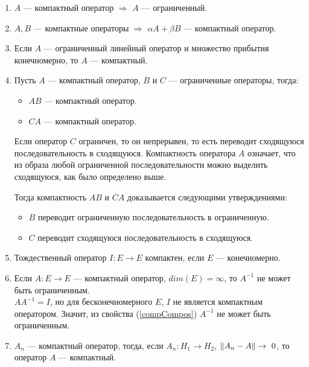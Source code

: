 \documentclass[12pt]{article}
\begin{document}
			\begin{enumerate}
				\item $A$ --- компактный оператор $\Rightarrow$ $A$ --- ограниченный.		
				\item $A, B$ --- компактные операторы $\Rightarrow$ $\alpha A + \beta B$ --- компактный оператор.		
				\item Если $A$ --- ограниченный линейный оператор и множество прибытия конечномерно, то $A$ --- компактный. \label{compArea}
				\item Пусть $A$ --- компактный оператор, $B$ и $C$ --- ограниченные операторы, тогда: \label{compCompos}
					\begin{itemize}
						\item $AB$ --- компактный оператор.
						\item $CA$ --- компактный оператор.
					\end{itemize}
		
					Если оператор $C$ ограничен, то он непрерывен, то есть переводит сходящуюся последовательность 
					в сходящуюся. Компактность оператора $A$ означает, что из образа любой ограниченной 
					последовательности можно выделить сходящуюся, как было определено выше.
		
					Тогда компактность $AB$ и $CA$ доказывается следующими утверждениями:
					\begin{itemize}
						\item $B$ переводит ограниченную последовательность в ограниченную.
						\item $C$ переводит сходящуюся последовательность в сходящуюся.
					\end{itemize}		
				\item Тождественный оператор $I:E\rightarrow E$ компактен, если $E$ --- конечномерно.
				\item Если $A:E \rightarrow E$ --- компактный оператор, $dim(E) = \infty$, то $A^{-1}$ не может быть ограниченным. \\

					$A A^{-1} = I$, но для бесконечномерного $E$, $I$ не является компактным оператором. Значит, 
					из свойства (\ref{compCompos}) $A^{-1}$ не может быть ограниченным.
				\item $A_n$ --- компактный оператор, тогда, если $A_n:H_1 \rightarrow H_2$, $\left\| A_n - A \right\| \rightarrow~0$, то 
				оператор $A$ --- компактный. \label{compLim}
		

\end{enumerate}
\end{document}
